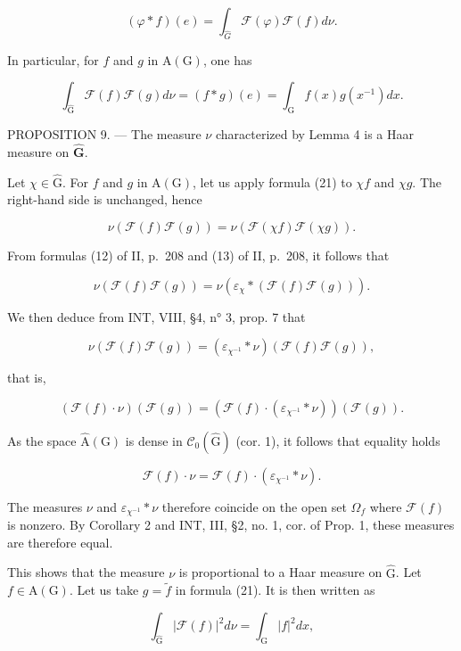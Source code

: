 \[
(\varphi * f) (e) = \int_ {\widehat {G}} \mathcal {F} (\varphi) \mathcal {F} (f) d \nu .\tag{20}
\]

In particular, for \(f\) and \(g\) in \(\mathrm{A}(\mathrm{G})\), one has

\[
\int_ {\widehat {\mathrm{G}}} \mathcal {F} (f) \mathcal {F} (g) d \nu = (f * g) (e) = \int_ {\mathrm{G}} f (x) g (x ^ {- 1}) d x.\tag{21}
\]

PROPOSITION 9. — The measure \(\nu\) characterized by Lemma 4 is a Haar measure on \(\widehat{\mathbf{G}}\).

Let \(\chi \in \widehat{\mathrm{G}}\). For \(f\) and \(g\) in \(\mathrm{A}(\mathrm{G})\), let us apply formula (21) to \(\chi f\) and \(\chi g\). The right-hand side is unchanged, hence

\[
\nu (\mathcal {F} (f) \mathcal {F} (g)) = \nu (\mathcal {F} (\chi f) \mathcal {F} (\chi g)).
\]

From formulas (12) of II, p.~208 and (13) of II, p.~208, it follows that

\[
\nu (\mathcal {F} (f) \mathcal {F} (g)) = \nu (\varepsilon_ {\chi} * (\mathcal {F} (f) \mathcal {F} (g))).
\]

We then deduce from INT, VIII, §4, n° 3, prop. 7 that

\[
\nu (\mathcal {F} (f) \mathcal {F} (g)) = (\varepsilon_ {\chi^ {- 1}} * \nu) (\mathcal {F} (f) \mathcal {F} (g)),
\]

that is,

\[
(\mathscr {F} (f) \cdot \nu) (\mathscr {F} (g)) = (\mathscr {F} (f) \cdot (\varepsilon_ {\chi^ {- 1}} * \nu)) (\mathscr {F} (g)).
\]

As the space \(\widehat{\mathrm{A}}(\mathrm{G})\) is dense in \(\mathcal{C}_{0}(\widehat{\mathrm{G}})\) (cor. 1), it follows that equality holds

\[
\mathscr {F} (f) \cdot \nu = \mathscr {F} (f) \cdot (\varepsilon_ {\chi^ {- 1}} * \nu).
\]

The measures \(\nu\) and \(\varepsilon_{\chi^{-1}} * \nu\) therefore coincide on the open set \(\Omega_f\) where \(\mathcal{F}(f)\) is nonzero. By Corollary 2 and INT, III, §2, no. 1, cor. of Prop. 1, these measures are therefore equal.

This shows that the measure \(\nu\) is proportional to a Haar measure on \(\widehat{\mathrm{G}}\). Let \(f \in \mathrm{A}(\mathrm{G})\). Let us take \(g = \widetilde{f}\) in formula (21). It is then written as

\[
\int_ {\widehat {\mathrm{G}}} | \mathcal {F} (f) | ^ {2} d \nu = \int_ {\mathrm{G}} | f | ^ {2} d x,\tag{22}
\]

